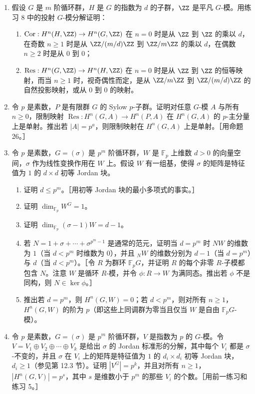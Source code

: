 \begin{enumerate}[label=\arabic*.]
  \item 假设 $G$ 是 $m$ 阶循环群，$H$ 是 $G$ 的指数为 $d$ 的子群，$\ZZ$ 是平凡 $G$-模。用练习 8 中的投射 $G$-模分解证明：
  \begin{enumerate}[label=(\alph*)]
    \item $\operatorname{Cor}:H^n(H,\ZZ)\to H^n(G,\ZZ)$ 在 $n=0$ 时是从 $\ZZ$ 到 $\ZZ$ 的乘以 $d$，在奇数 $n\geq1$ 时是从 $\ZZ/(m/d)\ZZ$ 到 $\ZZ/m\ZZ$ 的乘以 $d$，在偶数 $n\geq2$ 时是从 $0$ 到 $0$；
    \item $\operatorname{Res}:H^n(G,\ZZ)\to H^n(H,\ZZ)$ 在 $n=0$ 时是从 $\ZZ$ 到 $\ZZ$ 的恒等映射，而当 $n\geq1$ 时，视奇偶性而定，是从 $\ZZ/m\ZZ$ 到 $\ZZ/(m/d)\ZZ$ 的自然投影映射，或从 $0$ 到 $0$ 的映射。
  \end{enumerate}

  \item 令 $p$ 是素数，$P$ 是有限群 $G$ 的 Sylow $p$-子群。证明对任意 $G$-模 $A$ 与所有 $n\geq0$，限制映射 $\operatorname{Res}:H^n(G,A)\to H^n(P,A)$ 在 $H^n(G,A)$ 的 $p$-主分量上是单射。推出若 $|A|=p^a$，则限制映射在 $H^n(G,A)$ 上是单射。［用命题 26。］

  \item 令 $p$ 是素数，$G=(\sigma)$ 是 $p^m$ 阶循环群，$W$ 是 $\mathbb F_p$ 上维数 $d>0$ 的向量空间，$\sigma$ 作为线性变换作用在 $W$ 上。假设 $W$ 有一组基，使得 $\sigma$ 的矩阵是特征值为 $1$ 的 $d\times d$ 初等 Jordan 块。
  \begin{enumerate}[label=(\alph*)]
    \item 证明 $d\leq p^m$。［用初等 Jordan 块的最小多项式的事实。］
    \item 证明 $\dim_{\mathbb F_p}W^G=1$。
    \item 证明 $\dim_{\mathbb F_p}(\sigma-1)W=d-1$。
    \item 若 $N=1+\sigma+\cdots+\sigma^{p^m-1}$ 是通常的范元，证明当 $d=p^m$ 时 $NW$ 的维数为 $1$（当 $d<p^m$ 时维数为 $0$），并且 ${}_NW$ 的维数分别为 $d-1$（当 $d=p^m$）与 $d$（当 $d<p^m$）。［令 $R$ 为群环 $\mathbb F_pG$，并证明 $R$ 的每个非零 $R$-子模都包含 $N$。注意 $W$ 是循环 $R$-模，并令 $\phi:R\to W$ 为满同态。推出若 $\phi$ 不是同构，则 $N\in\ker\phi$。］
    \item 推出若 $d=p^m$，则 $H^n(G,W)=0$；若 $d<p^m$，则对所有 $n\geq1$，$H^n(G,W)$ 的阶为 $p$（即这些上同调群为零当且仅当 $W$ 是自由 $\mathbb F_pG$-模）。
  \end{enumerate}

  \item 令 $p$ 是素数，$G=(\sigma)$ 是 $p^m$ 阶循环群，$V$ 是指数为 $p$ 的 $G$-模。令 $V=V_1\oplus V_2\oplus\cdots\oplus V_k$ 是给出 $\sigma$ 的 Jordan 标准形的分解，其中每个 $V_i$ 都是 $\sigma$-不变的，并且 $\sigma$ 在 $V_i$ 上的矩阵是特征值为 $1$ 的 $d_i\times d_i$ 初等 Jordan 块，$d_i\geq1$（参见第 12.3 节）。证明 $|V^G|=p^k$，并且对所有 $n\geq1$，$|H^n(G,V)|=p^s$，其中 $s$ 是维数小于 $p^m$ 的那些 $V_i$ 的个数。［用前一练习和练习 5。］


\end{enumerate}
